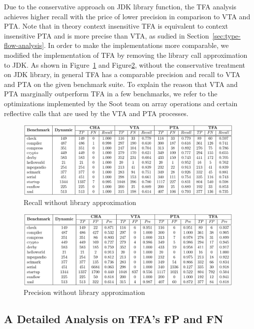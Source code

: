 \documentclass{fac}
\begin{document}
Due to the conservative approach on JDK library function, the TFA analysis achieves higher recall with the price of lower precision in comparison to VTA and PTA. Note that in theory context insensitive TFA is equivalent to context insensitive PTA and is more precise than VTA, as sudied in Section~\ref{sec:type-flow-analysis}. In order to make the implementations more comparable, we modified the implementation of TFA by removing the library call approximation to JDK. As shown in Figure~\ref{fig:nolib-recall} and Figure\ref{fig:nolib-precision}, without the conservative treatment on JDK library, in general TFA has a comparable precision and recall to VTA and PTA on the given benchmark suite. To explain the reason that VTA and PTA marginally outperform TFA in a few benchmarks, we refer to the optimizations implemented by the Soot team on array operations and certain reflective calls that are used by the VTA and PTA processes.

\begin{figure}\centering
\includegraphics[scale=0.9]{recall-no-lib.pdf}
\caption{Recall without library approximation}
\label{fig:nolib-recall}
\end{figure}

\begin{figure}\centering
\includegraphics[scale=0.9]{precision-no-lib.pdf}
\caption{Precision without library approximation}
\label{fig:nolib-precision}
\end{figure}

\subsection{A Detailed Analysis on TFA's FP and FN}\label{subsec:analysis}
\end{document}
